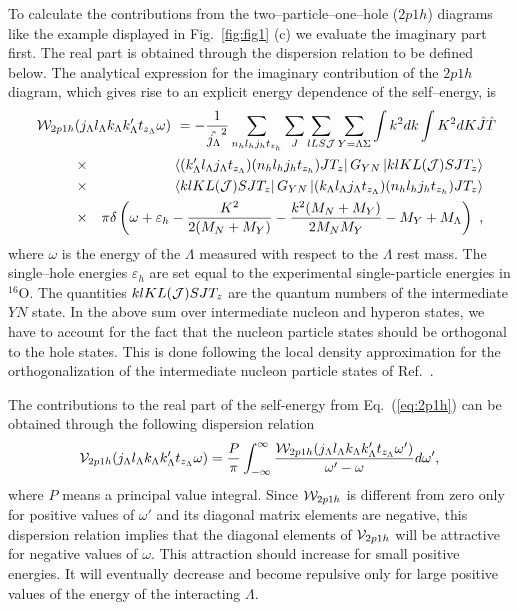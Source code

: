 To calculate the contributions from the two--particle--one--hole ($2p1h$)
diagrams like the example displayed in Fig.\
\ref{fig:fig1} (c)
we evaluate the imaginary part first. The real part is obtained
through the dispersion relation to be defined below.
The analytical expression for the imaginary contribution of the
$2p1h$ diagram, which gives rise to an explicit energy dependence of
the self--energy, is
\begin{eqnarray}
\lefteqn{{\cal W}_{2p1h}(j_{\Lambda}l_{\Lambda}k_{\Lambda}
      k_{\Lambda}'t_{z_{\Lambda}}\omega) \ = 
      {\displaystyle -\frac{1}
      {\hat{j_{\Lambda}}^2}\sum_{n_hl_hj_ht_{z_h}}
      \sum_{J}\sum_{lLS{\cal J}}\sum_{Y=\Lambda\Sigma}\int k^{2}dk
      \int K^{2}dK\hat{J}\hat{T}}}\hspace{1cm}\nonumber \\
      &\times& \left\langle (k_{\Lambda}'l_{\Lambda}j_{\Lambda}
      t_{z_{\Lambda}})(n_hl_hj_ht_{z_h})JT_z\right |
      G_{YN}\left | klKL({\cal J})SJT_z \right \rangle\nonumber \\
      &\times& \left\langle klKL({\cal J})SJT_z \right | G_{YN}
      \left | (k_{\Lambda}l_{\Lambda}j_{\Lambda}
      t_{z_{\Lambda}})(n_hl_hj_ht_{z_h})JT_z \right \rangle \nonumber
      \\ &\times& \pi\delta
      \left(\omega +\varepsilon_h -\frac{K^2}{2(M_N+M_Y)} -
      \frac{k^2(M_N+M_Y)}{2M_NM_Y}-M_Y+M_\Lambda \right) \ ,
   \label{eq:2p1h}
\end{eqnarray}
where $\omega$ is the energy of the $\Lambda$ measured with respect
to the $\Lambda$ rest mass.
The single--hole energies $\varepsilon_{h}$ are set equal to the
experimental single-particle energies in $^{16}$O.
The quantities $klKL({\cal J})SJT_z$ are the
quantum numbers of the intermediate $YN$ state.
In the above sum over intermediate nucleon and hyperon states, we have to
account for the fact that the nucleon particle states should be orthogonal
to the hole states. This is done following the
local density approximation for the orthogonalization of the intermediate
nucleon particle states of Ref.\  \cite{bbmp92}.

The  contributions to the real part of the self-energy from Eq.\
(\ref{eq:2p1h}) can be obtained through the following
dispersion relation
\begin{equation}
   {\cal V}_{2p1h}(j_{\Lambda}l_{\Lambda}k_{\Lambda}k_{\Lambda}'
   t_{z_{\Lambda}} \omega)=
   \frac{P}{\pi} \int_{-\infty}^{\infty}
   \frac{{\cal W}_{2p1h}(j_{\Lambda}l_{\Lambda}k_{\Lambda}
    k_{\Lambda}'
    t_{z_{\Lambda}} \omega')}{\omega'-\omega} d\omega',
    \label{eq:disprel}
\end{equation}
where $P$ means a principal value integral. Since  ${\cal W}_{2p1h}$
is different from zero only for positive values of
$\omega'$ and its diagonal matrix elements are negative,
this dispersion relation  implies that the diagonal elements of
${\cal V}_{2p1h}$ will be attractive for
negative values of $\omega$. This attraction should increase for small
positive energies. It will eventually decrease and become repulsive
only
for large positive values of the energy of the interacting $\Lambda$.


